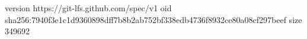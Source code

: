 version https://git-lfs.github.com/spec/v1
oid sha256:7940f3e1c1d9360898dff7b8b2ab752bf338edb4736f8932ce80a08cf297beef
size 349692
